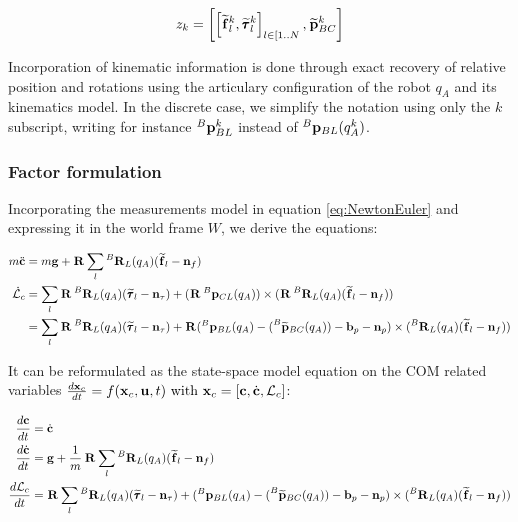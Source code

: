 \documentclass[11pt]{article}
\newcommand{\Rot}[2]{\prescript{#1}{}{\bfR}_{#2}}
\newcommand{\noise}{\bfn}
\newcommand{\bias}{\bfb}
\newcommand{\posi}[2]{\prescript{#1}{}{\bfp}_{#2}}
\newcommand{\posim}[2]{\prescript{#1}{}{\widetilde{\bfp}}_{#2}}
\newcommand{\forcem}[2]{\prescript{#1}{}{\widetilde{\bff}}_{#2}}
\newcommand{\torquem}[2]{\prescript{#1}{}{\widetilde{\pmb{\tau}}}_{#2}}
\newcommand{\AM}{\mathcal{L}}
\newcommand{\COM}{\bfc}
\newcommand{\COMd}{\dot{\bfc}}
\begin{document}
\begin{equation}
z_k = \left[\left[\forcem{}{l}^k, \torquem{}{l}^k \right]_{l \in [1..N}, \posim{}{BC}^k \right]
\end{equation}
%

Incorporation of kinematic information is done through exact recovery of relative position and rotations using the articulary configuration of the robot $q_A$ and its kinematics model. In the discrete case, we simplify the notation using only the $k$ subscript, writing for instance $\posi{B}{BL}^k$ instead of $\posi{B}{BL}(q_A^k)$.

\subsubsection{Factor formulation}
Incorporating the measurements model in equation \ref{eq:NewtonEuler} and expressing it in the world frame \(W\), we derive the equations:

\begin{equation}
\begin{split}
m\ddot{\COM}&= 
m\bfg + \Rot{}{} \sum_l \Rot{B}{L}(q_A) (\forcem{}{l} - \noise_f) 
\\
\dot{\AM}_c&= 
\sum_l \Rot{}{}\Rot{B}{L}(q_A)(\torquem{}{l} - \noise_{\tau}) + (\Rot{}{} \posi{B}{CL}(q_A)) \times (\Rot{}{}\Rot{B}{L}(q_A)(\forcem{}{l} - \noise_f))
\\
&= \sum_l \Rot{}{}\Rot{B}{L}(q_A)(\torquem{}{l} - \noise_{\tau}) + \Rot{}{}( \posi{B}{BL}(q_A) - (\posim{B}{BC}(q_A)) -  \bias_{p} - \noise_p) \times (\Rot{B}{L}(q_A)(\forcem{}{l} - \noise_f))
\end{split}
\end{equation}

It can be reformulated as the state-space model equation on the COM related variables \( \frac{d\bfx_c}{dt}= f(\bfx_c, \bfu, t)$ with $\bfx_c = [\COM, \COMd, \AM_c]\):

\begin{equation}
\begin{split}
\frac{d\COM}{dt} &= \COMd 
\\
\frac{d\dot{\bfc}}{dt}&= \bfg + \frac{1}{m} \Rot{}{} \sum_l \Rot{B}{L}(q_A) (\forcem{}{l} - \noise_f) 
\\
\frac{d\AM_c}{dt}&= \Rot{}{} \sum_l \Rot{B}{L}(q_A)(\torquem{}{l} - \noise_{\tau}) + (\posi{B}{BL}(q_A) - (\posim{B}{BC}(q_A)) -  \bias_{p} - \noise_p) \times (\Rot{B}{L}(q_A)(\forcem{}{l} - \noise_f))
\end{split}
\label{eq:COMContinuous}
\end{equation}
\end{document}
